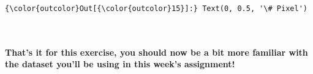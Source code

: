 \documentclass[11pt]{article}
\begin{document}
\begin{Verbatim}[commandchars=\\\{\}]
{\color{outcolor}Out[{\color{outcolor}15}]:} Text(0, 0.5, '\# Pixel')
\end{Verbatim}
            
    \begin{center}
    \end{center}
    { \hspace*{\fill} \\}
    
    \hypertarget{thats-it-for-this-exercise-you-should-now-be-a-bit-more-familiar-with-the-dataset-youll-be-using-in-this-weeks-assignment}{%
\paragraph{That's it for this exercise, you should now be a bit more
familiar with the dataset you'll be using in this week's
assignment!}\label{thats-it-for-this-exercise-you-should-now-be-a-bit-more-familiar-with-the-dataset-youll-be-using-in-this-weeks-assignment}}


    
    
    
    
\end{document}
